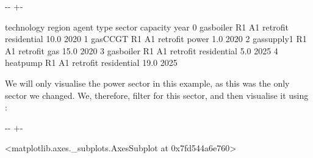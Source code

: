 \documentclass[letterpaper,10pt,english]{sphinxmanual}
\newlength\nbsphinxcodecellspacing
\begin{document}
{

\kern-\sphinxverbatimsmallskipamount\kern-\baselineskip
\kern+\FrameHeightAdjust\kern-\fboxrule
\vspace{\nbsphinxcodecellspacing}

\begin{sphinxVerbatim}[commandchars=\\\{\}]
\llap{\color{nbsphinxout}[6]:\,\hspace{\fboxrule}\hspace{\fboxsep}}   technology region agent      type       sector  capacity  year
0   gasboiler     R1    A1  retrofit  residential      10.0  2020
1     gasCCGT     R1    A1  retrofit        power       1.0  2020
2  gassupply1     R1    A1  retrofit          gas      15.0  2020
3   gasboiler     R1    A1  retrofit  residential       5.0  2025
4    heatpump     R1    A1  retrofit  residential      19.0  2025
\end{sphinxVerbatim}
}

We will only visualise the power sector in this example, as this was the only sector we changed. We, therefore, filter for this sector, and then visualise it using :

{
\begin{sphinxVerbatim}[commandchars=\\\{\}]
\llap{\color{nbsphinxin}[7]:\,\hspace{\fboxrule}\hspace{\fboxsep}}  \PYG{p}{[}\PYG{p}{]}
   
\end{sphinxVerbatim}
}

{

\kern-\sphinxverbatimsmallskipamount\kern-\baselineskip
\kern+\FrameHeightAdjust\kern-\fboxrule
\vspace{\nbsphinxcodecellspacing}

\begin{sphinxVerbatim}[commandchars=\\\{\}]
\llap{\color{nbsphinxout}[7]:\,\hspace{\fboxrule}\hspace{\fboxsep}}<matplotlib.axes.\_subplots.AxesSubplot at 0x7fd544a6e760>
\end{sphinxVerbatim}
}
\end{document}
